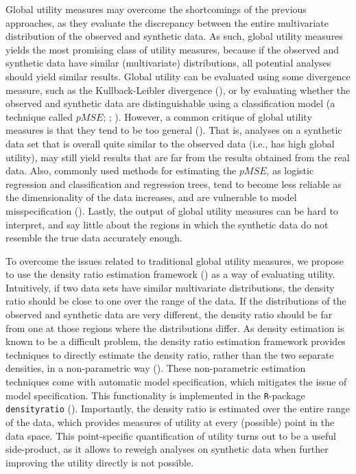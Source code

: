 \documentclass[
]{article}
\begin{document}
Global utility measures may overcome the shortcomings of the previous
approaches, as they evaluate the discrepancy between the entire
multivariate distribution of the observed and synthetic data. As such,
global utility measures yields the most promising class of utility
measures, because if the observed and synthetic data have similar
(multivariate) distributions, all potential analyses should yield
similar results. Global utility can be evaluated using some divergence
measure, such as the Kullback-Leibler divergence
(), or by evaluating
whether the observed and synthetic data are distinguishable using a
classification model (a technique called \(pMSE\);
;
). However, a common
critique of global utility measures is that they tend to be too general
(). That is,
analyses on a synthetic data set that is overall quite similar to the
observed data (i.e., has high global utility), may still yield results
that are far from the results obtained from the real data. Also,
commonly used methods for estimating the \(pMSE\), as logistic
regression and classification and regression trees, tend to become less
reliable as the dimensionality of the data increases, and are vulnerable
to model misspecification
(). Lastly, the
output of global utility measures can be hard to interpret, and say
little about the regions in which the synthetic data do not resemble the
true data accurately enough.

To overcome the issues related to traditional global utility measures,
we propose to use the density ratio estimation framework
() as a way of evaluating utility. Intuitively, if two
data sets have similar multivariate distributions, the density ratio
should be close to one over the range of the data. If the distributions
of the observed and synthetic data are very different, the density ratio
should be far from one at those regions where the distributions differ.
As density estimation is known to be a difficult problem, the density
ratio estimation framework provides techniques to directly estimate the
density ratio, rather than the two separate densities, in a
non-parametric way
(). These non-parametric estimation techniques come with
automatic model specification, which mitigates the issue of model
specification. This functionality is implemented in the
\texttt{R}-package \texttt{densityratio}
(). Importantly, the density
ratio is estimated over the entire range of the data, which provides
measures of utility at every (possible) point in the data space. This
point-specific quantification of utility turns out to be a useful
side-product, as it allows to reweigh analyses on synthetic data when
further improving the utility directly is not possible.
\end{document}
